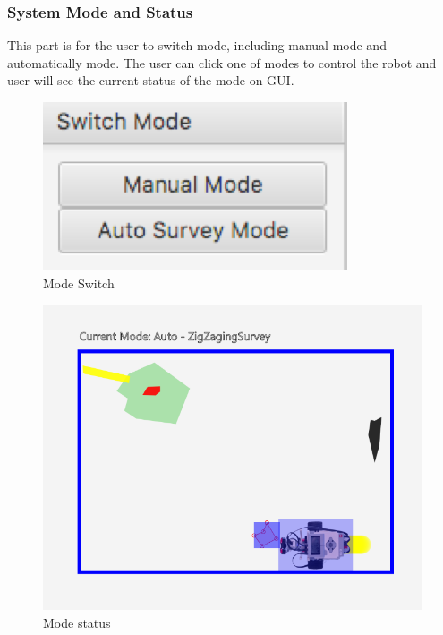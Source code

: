 \documentclass[10pt,a4paper,titlepage]{article}
\begin{document}
  \subsubsection{System Mode and Status} 
  This part is for the user to switch mode, including manual mode and automatically mode. The user can click one of modes to control the robot and user will see the current status of the mode on GUI.  \begin{figure}[H] 
  \includegraphics[width=\linewidth]{mode.png}  %
  \caption{Mode Switch} 
  \label{fig:Mode Switch}               
  \end{figure} 
  \begin{figure}[H] 
  \includegraphics[width=\linewidth]{status.png}  %
  \caption{Mode status} 
  \label{fig:Mode status}               
  \end{figure} 
\end{document}
